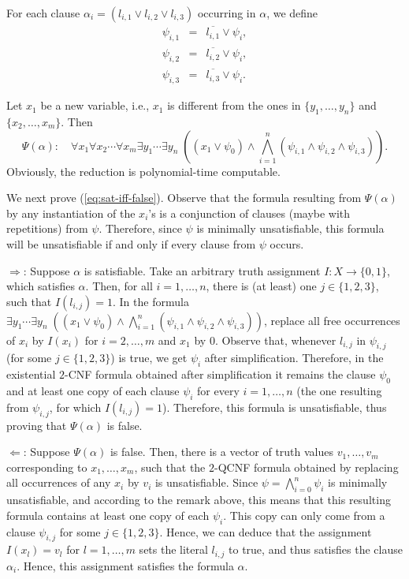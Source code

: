 \documentclass[aop,noinfoline]{imsart}
\renewcommand{\Box}{{\vrule width0.6ex height1em depth0cm}}
\newenvironment{proof}{\noindent{\bf Proof:}}{\hfill \Box}
\newcommand{\negate}[1]{\overline{#1}}
\begin{document}
\begin{proof}
For each clause $\alpha_i= (l_{i,1} \lor l_{i,2} \lor l_{i,3})$
occurring in $\alpha$, we define
\begin{eqnarray*}
  \psi_{i,1} & = & \negate{l_{i,1}} \lor \psi_i, \\
  \psi_{i,2} & = & \negate{l_{i,2}} \lor \psi_i, \\
  \psi_{i,3} & = & \negate{l_{i,3}} \lor \psi_i.
\end{eqnarray*}


Let $x_1$ be a new variable, i.e., $x_1$ is different from the
ones in $\{y_1, \ldots , y_n\}$ and $\{x_2, \ldots , x_m\}$. Then
$$
\Psi(\alpha) \colon \quad \forall x_1 \forall x_2\cdots \forall
x_m \exists y_1 \cdots \exists y_n \; ((x_1 \lor \psi_0) \land
\bigwedge_{i=1}^n (\psi_{i,1} \land \psi_{i,2} \land \psi_{i,3})).
$$
Obviously, the reduction is polynomial-time
computable.

\medskip

We next prove (\ref{eq:sat-iff-false}).  Observe that the formula
resulting from $\Psi(\alpha)$ by any instantiation of the $x_i$'s
is a conjunction of  clauses (maybe with repetitions) from
$\psi$. Therefore, since $\psi$ is minimally unsatisfiable, this
formula will be unsatisfiable if and only if every clause from
$\psi$ occurs.

\noindent $\Longrightarrow$: Suppose $\alpha$ is satisfiable. Take
an arbitrary truth assignment $I: X \rightarrow \{0,1\}$, which satisfies  $\alpha$.
Then, for all $i=1,\ldots , n$, there is (at least) one $j\in
\{1,2,3\}$, such that $I(l_{i,j}) = 1$. In the formula $\exists
y_1 \cdots \exists y_n \; ((x_1 \lor \psi_0) \land
\bigwedge_{i=1}^n (\psi_{i,1} \land \psi_{i,2} \land
\psi_{i,3}))$, replace all free occurrences of $x_i$ by $I(x_i)$
for $i=2,\ldots, m$ and $x_1$ by $0$. Observe that, whenever $l_{i,j}$ in $\psi_{i,j}$ (for some $j\in
\{1,2,3\}$) is true, we get $\psi_i$ after  simplification. Therefore, in the existential $2$-CNF
formula obtained after simplification it remains the clause
$\psi_0$ and at least one copy of each clause $\psi_i$ for every
$i=1,\ldots , n$ (the one resulting from $\psi_{i,j}$, for which
$I(l_{i,j}) = 1$). Therefore, this formula is unsatisfiable, thus
proving that $\Psi(\alpha)$ is false.




\noindent $\Longleftarrow$: Suppose $\Psi(\alpha)$ is false. Then,
there is a vector of truth values $v_1 ,\ldots , v_m$
corresponding to $x_1,\ldots , x_m$, such that the $2$-QCNF
formula obtained  by replacing all  occurrences of any $x_i$ by
$v_i$ is unsatisfiable. Since $\psi=\bigwedge_{i=0}^n \psi_i$ is
minimally unsatisfiable, and according to the remark above, this
means that this resulting formula contains at least one copy of
each $\psi_i$. This copy can only come from a clause $\psi_{i,j}$
for some $j\in \{1,2,3\}$. Hence, we can deduce that the
assignment $I(x_l)=v_l$ for $l=1,\ldots , m$  sets the literal
$l_{i,j}$ to true, and thus satisfies the clause $\alpha_i$.
Hence, this assignment satisfies the formula $\alpha$.
\end{proof}
\end{document}
